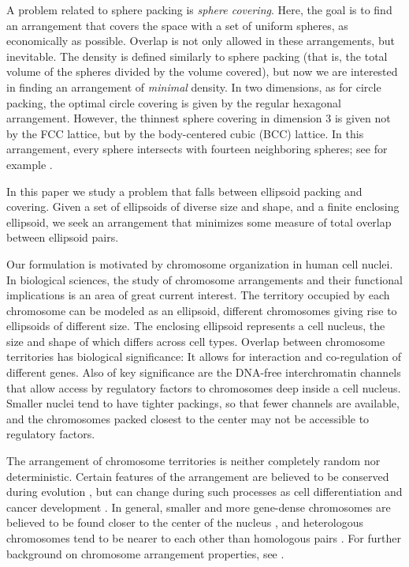 \documentclass{siamltex}
\begin{document}
A problem related to sphere packing is {\em sphere covering}. Here,
the goal is to find an arrangement that covers the space with a set of
uniform spheres, as economically as possible. Overlap is not only
allowed in these arrangements, but inevitable. The density is defined
similarly to sphere packing (that is, the total volume of the spheres
divided by the volume covered), but now we are interested in finding
an arrangement of {\em minimal} density. In two dimensions, as for
circle packing, the optimal circle covering is given by the regular
hexagonal arrangement. However, the thinnest sphere covering in
dimension 3 is given not by the FCC lattice, but by the body-centered
cubic (BCC) lattice. In this arrangement, every sphere intersects with
fourteen neighboring spheres; see for example \cite{Rogers}.

In this paper we study a problem that falls between ellipsoid
packing and covering. Given a set of ellipsoids of diverse size and
shape, and a finite enclosing ellipsoid, we seek an arrangement that
minimizes some measure of total overlap between ellipsoid pairs.

Our formulation is motivated by chromosome organization in human cell
nuclei. In biological sciences, the study of chromosome arrangements
and their functional implications is an area of great current
interest.  The territory occupied by each chromosome can be modeled as
an ellipsoid, different chromosomes giving rise to ellipsoids of
different size. The enclosing ellipsoid represents a cell nucleus, the
size and shape of which differs across cell types. Overlap between
chromosome territories has biological significance: It allows for
interaction and co-regulation of different genes. Also of key
significance are the DNA-free interchromatin channels that allow
access by regulatory factors to chromosomes deep inside a cell
nucleus.  Smaller nuclei tend to have tighter packings, so that fewer
channels are available, and the chromosomes packed closest to the
center may not be accessible to regulatory factors.

The arrangement of chromosome territories is neither completely random
nor deterministic. Certain features of the arrangement are believed to
be conserved during evolution \cite{Cremer_primates}, but can change
during such processes as cell differentiation and cancer development
\cite{Berezney_cancer}.  In general, smaller and more
gene-dense chromosomes are believed to be found closer to the center
of the nucleus \cite{Cremer_radial}, and heterologous chromosomes tend
to be nearer to each other than homologous pairs
\cite{Khalil_heterologues}. For further background on chromosome arrangement properties,
see \cite{Cremer, Berezney_nonrandom}. 
\end{document}
